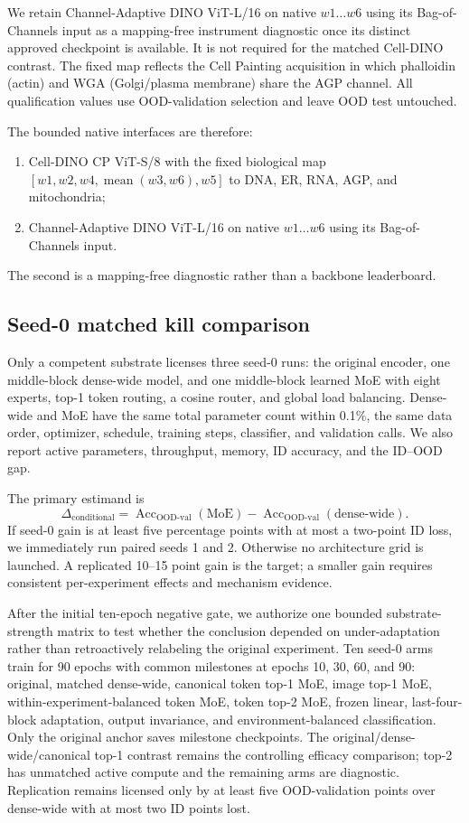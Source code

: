 We retain Channel-Adaptive DINO ViT-L/16 on native $w1\ldots w6$ using its Bag-of-Channels input as
a mapping-free instrument diagnostic once its distinct approved checkpoint is available. It is
not required for the matched Cell-DINO contrast. The fixed map reflects the Cell Painting
acquisition in which phalloidin (actin) and WGA (Golgi/plasma membrane) share the AGP channel.
All qualification values use OOD-validation selection and leave OOD test untouched.

The bounded native interfaces are therefore:
\begin{enumerate}
  \item Cell-DINO CP ViT-S/8 with the fixed biological map
  $[w1,w2,w4,\operatorname{mean}(w3,w6),w5]$ to DNA, ER, RNA, AGP, and mitochondria;
  \item Channel-Adaptive DINO ViT-L/16 on native $w1\ldots w6$ using its Bag-of-Channels input.
\end{enumerate}
The second is a mapping-free diagnostic rather than a backbone leaderboard.

\subsection{Seed-0 matched kill comparison}
Only a competent substrate licenses three seed-0 runs: the original encoder, one middle-block
dense-wide model, and one middle-block learned MoE with eight experts, top-1 token routing, a
cosine router, and global load balancing. Dense-wide and MoE have the same total parameter count
within 0.1\%, the same data order, optimizer, schedule, training steps, classifier, and validation
calls. We also report active parameters, throughput, memory, ID accuracy, and the ID--OOD gap.

The primary estimand is
\[
  \Delta_{\mathrm{conditional}} =
  \operatorname{Acc}_{\mathrm{OOD\mbox{-}val}}(\mathrm{MoE})-
  \operatorname{Acc}_{\mathrm{OOD\mbox{-}val}}(\mathrm{dense\mbox{-}wide}).
\]
If seed-0 gain is at least five percentage points with at most a two-point ID loss, we immediately
run paired seeds 1 and 2. Otherwise no architecture grid is launched. A replicated 10--15 point
gain is the target; a smaller gain requires consistent per-experiment effects and mechanism
evidence.

After the initial ten-epoch negative gate, we authorize one bounded substrate-strength matrix to
test whether the conclusion depended on under-adaptation rather than retroactively relabeling the
original experiment. Ten seed-0 arms train for 90 epochs with common milestones at epochs
10, 30, 60, and 90: original, matched dense-wide, canonical token top-1 MoE, image top-1 MoE,
within-experiment-balanced token MoE, token top-2 MoE, frozen linear, last-four-block adaptation,
output invariance, and environment-balanced classification. Only the original anchor saves
milestone checkpoints. The original/dense-wide/canonical top-1 contrast remains the controlling
efficacy comparison; top-2 has unmatched active compute and the remaining arms are diagnostic.
Replication remains licensed only by at least five OOD-validation points over dense-wide with at
most two ID points lost.

